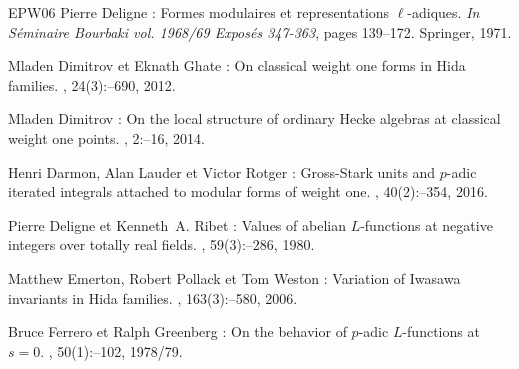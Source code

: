 \documentclass[12pt]{amsart}
\theoremstyle{defstyle}
\theoremstyle{thmstyle}
\begin{document}
\begin{thebibliography}{EPW06}
Pierre \bgroup\fonteauteurs\bgroup Deligne\egroup\egroup{} :
\newblock Formes modulaires et representations {$\ell$}-adiques.
\newblock \emph{In} {\em S{\'e}minaire Bourbaki vol. 1968/69 Expos{\'e}s
  347-363}, pages 139--172. Springer, 1971.

Mladen \bgroup\fonteauteurs\bgroup Dimitrov\egroup\egroup{} et Eknath
  \bgroup\fonteauteurs\bgroup Ghate\egroup\egroup{} :
\newblock On classical weight one forms in {H}ida families.
, 24(3)\string:--690, 2012.

Mladen \bgroup\fonteauteurs\bgroup Dimitrov\egroup\egroup{} :
\newblock On the local structure of ordinary {H}ecke algebras at classical
  weight one points.
,
  2\string:--16, 2014.

Henri \bgroup\fonteauteurs\bgroup Darmon\egroup\egroup{}, Alan
  \bgroup\fonteauteurs\bgroup Lauder\egroup\egroup{} et Victor
  \bgroup\fonteauteurs\bgroup Rotger\egroup\egroup{} :
\newblock Gross-{S}tark units and {$p$}-adic iterated integrals attached to
  modular forms of weight one.
, 40(2)\string:--354,
  2016.

Pierre \bgroup\fonteauteurs\bgroup Deligne\egroup\egroup{} et Kenneth~A.
  \bgroup\fonteauteurs\bgroup Ribet\egroup\egroup{} :
\newblock Values of abelian {$L$}-functions at negative integers over totally
  real fields.
, 59(3)\string:--286, 1980.

Matthew \bgroup\fonteauteurs\bgroup Emerton\egroup\egroup{}, Robert
  \bgroup\fonteauteurs\bgroup Pollack\egroup\egroup{} et Tom
  \bgroup\fonteauteurs\bgroup Weston\egroup\egroup{} :
\newblock Variation of {I}wasawa invariants in {H}ida families.
, 163(3)\string:--580, 2006.

Bruce \bgroup\fonteauteurs\bgroup Ferrero\egroup\egroup{} et Ralph
  \bgroup\fonteauteurs\bgroup Greenberg\egroup\egroup{} :
\newblock On the behavior of {$p$}-adic {$L$}-functions at {$s=0$}.
, 50(1)\string:--102, 1978/79.


\end{thebibliography}
\end{document}
